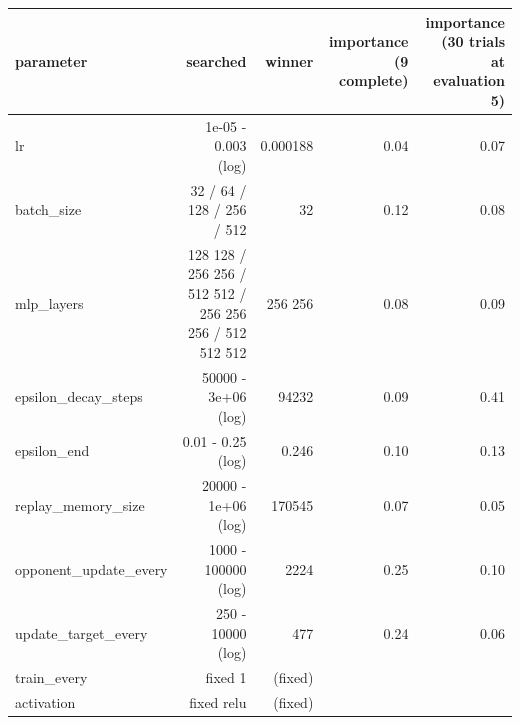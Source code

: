 \begin{tabular}{lrrrr}
\toprule
parameter & searched & winner & importance (9 complete) & importance (30 trials at evaluation 5) \\
\midrule
lr & 1e-05 - 0.003 (log) & 0.000188 & 0.04 & 0.07 \\
batch\_size & 32 / 64 / 128 / 256 / 512 & 32 & 0.12 & 0.08 \\
mlp\_layers & 128 128 / 256 256 / 512 512 / 256 256 256 / 512 512 512 & 256 256 & 0.08 & 0.09 \\
epsilon\_decay\_steps & 50000 - 3e+06 (log) & 94232 & 0.09 & 0.41 \\
epsilon\_end & 0.01 - 0.25 (log) & 0.246 & 0.10 & 0.13 \\
replay\_memory\_size & 20000 - 1e+06 (log) & 170545 & 0.07 & 0.05 \\
opponent\_update\_every & 1000 - 100000 (log) & 2224 & 0.25 & 0.10 \\
update\_target\_every & 250 - 10000 (log) & 477 & 0.24 & 0.06 \\
train\_every & fixed 1 & (fixed) &  &  \\
activation & fixed relu & (fixed) &  &  \\
\bottomrule
\end{tabular}
